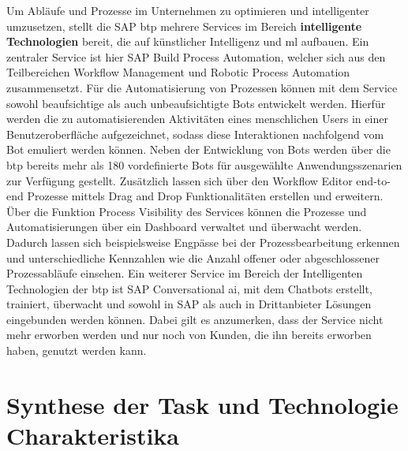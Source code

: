 Um Abläufe und Prozesse im Unternehmen zu optimieren und intelligenter umzusetzen, stellt die SAP \ac{btp} mehrere Services im Bereich \textbf{intelligente Technologien} bereit, die auf künstlicher Intelligenz und \ac{ml} aufbauen.  Ein zentraler Service ist hier SAP Build Process Automation, welcher sich aus den Teilbereichen Workflow Management und Robotic Process Automation zusammensetzt. Für die Automatisierung von Prozessen können mit dem Service sowohl beaufsichtige als auch unbeaufsichtigte Bots entwickelt werden. Hierfür werden die zu automatisierenden Aktivitäten eines menschlichen Users in einer Benutzeroberfläche aufgezeichnet, sodass diese Interaktionen nachfolgend vom Bot emuliert werden können. Neben der Entwicklung von Bots werden über die \ac{btp} bereits mehr als 180 vordefinierte Bots für ausgewählte Anwendungsszenarien zur Verfügung gestellt. \autocite[Vgl.][S. 74-76]{SEUBERT} Zusätzlich lassen sich über den Workflow Editor end-to-end Prozesse mittels Drag and Drop Funktionalitäten erstellen und erweitern. Über die Funktion Process Visibility des Services können die Prozesse und Automatisierungen über ein Dashboard verwaltet und überwacht werden. Dadurch lassen sich beispielsweise Engpässe bei der Prozessbearbeitung erkennen und unterschiedliche Kennzahlen wie die Anzahl offener oder abgeschlossener Prozessabläufe einsehen. \autocite[Vgl.][S. 5]{FSDBPA}
Ein weiterer Service im Bereich der Intelligenten Technologien der \ac{btp} ist SAP Conversational \acs{ai}, mit dem Chatbots erstellt, trainiert, überwacht und sowohl in SAP als auch in Drittanbieter Lösungen eingebunden werden können. Dabei gilt es anzumerken, dass der Service nicht mehr erworben werden und nur noch von Kunden, die ihn bereits erworben haben, genutzt werden kann. \autocite[Vgl.][]{CONVERSATIONALFSD2021}




\section{Synthese der Task und Technologie Charakteristika}


